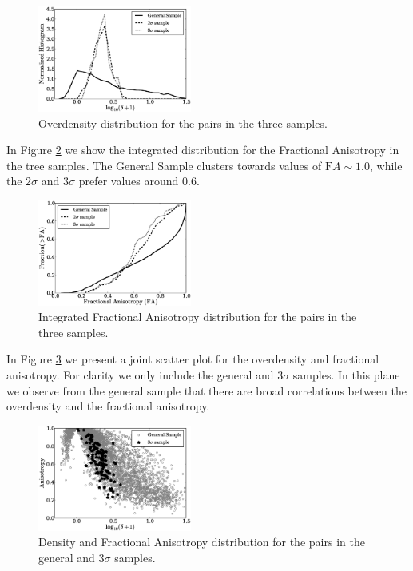 \documentclass{emulateapj}
\begin{document}
\begin{figure}
\begin{center}
  \includegraphics[width=0.45\textwidth]{density_histogram.eps}
\end{center}
\caption{Overdensity distribution for the pairs in the three samples.
    \label{fig:density}}  
\end{figure}


In Figure \ref{fig:FA} we show the integrated distribution for the
Fractional Anisotropy in the tree samples. The General Sample clusters
towards values of ${\mathrm FA}\sim 1.0$, while the $2\sigma$ and
$3\sigma$ prefer values around $0.6$.

\begin{figure}
\begin{center}
  \includegraphics[width=0.45\textwidth]{FA_histogram.eps}
\end{center}
\caption{Integrated Fractional Anisotropy distribution for the pairs
  in the three samples. 
    \label{fig:FA}}  
\end{figure}

In Figure \ref{fig:delta_FA} we present a joint scatter plot for the
overdensity and fractional anisotropy. For clarity we only include the
general and $3\sigma$ samples. In this plane we observe from the general
sample that there are broad correlations between the overdensity and
the fractional anisotropy. 




\begin{figure}
\begin{center}
  \includegraphics[width=0.45\textwidth]{FA_delta_scatter.eps}
\end{center}
\caption{Density and Fractional Anisotropy distribution for the pairs
  in the general and $3\sigma$ samples. 
    \label{fig:delta_FA}}  
\end{figure}
\end{document}
